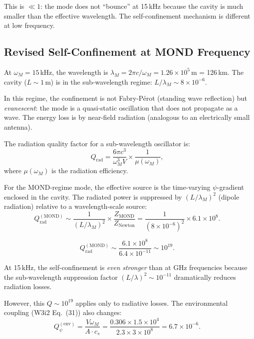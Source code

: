 \documentclass[11pt]{article}
\theoremstyle{definition}
\theoremstyle{remark}
\newcommand{\Qpsi}{Q_\psi}
\begin{document}
This is $\ll 1$: the mode does not ``bounce'' at 15\,kHz because
the cavity is much smaller than the effective wavelength. The
self-confinement mechanism is different at low frequency.

\subsection{Revised Self-Confinement at MOND Frequency}

At $\omega_M = 15$\,kHz, the wavelength is
$\lambda_M = 2\pi c / \omega_M = 1.26 \times 10^5$\,m = 126\,km.
The cavity ($L \sim 1$\,m) is in the sub-wavelength regime:
$L / \lambda_M \sim 8 \times 10^{-6}$.

In this regime, the confinement is not Fabry-P\'erot (standing wave
reflection) but \emph{evanescent}: the mode is a quasi-static
oscillation that does not propagate as a wave. The energy loss is
by near-field radiation (analogous to an electrically small antenna).

The radiation quality factor for a sub-wavelength oscillator is:
\begin{equation}
Q_{\mathrm{rad}} = \frac{6\pi c^3}{\omega_M^3 V}
\times \frac{1}{\mu(\omega_M)},
\end{equation}
where $\mu(\omega_M)$ is the radiation efficiency.

For the MOND-regime mode, the effective source is the time-varying
$\psi$-gradient enclosed in the cavity. The radiated power is
suppressed by $(L/\lambda_M)^2$ (dipole radiation) relative to a
wavelength-scale source:
\begin{equation}
Q_{\mathrm{rad}}^{(\mathrm{MOND})} \sim \frac{1}{(L/\lambda_M)^2}
\times \frac{Z_{\mathrm{MOND}}}{Z_{\mathrm{Newton}}}
= \frac{1}{(8 \times 10^{-6})^2} \times 6.1 \times 10^8.
\end{equation}

\begin{equation}
\boxed{Q_{\mathrm{rad}}^{(\mathrm{MOND})} \sim \frac{6.1 \times 10^8}
{6.4 \times 10^{-11}} \sim 10^{19}.}
\label{eq:Q-mond-15kHz}
\end{equation}

At 15\,kHz, the self-confinement is \emph{even stronger} than at
GHz frequencies because the sub-wavelength suppression factor
$(L/\lambda)^2 \sim 10^{-11}$ dramatically reduces radiation losses.

However, this $Q \sim 10^{19}$ applies only to radiative losses.
The environmental coupling (W3i2 Eq.~(31)) also changes:
\begin{equation}
\Qpsi^{(\mathrm{env})} = \frac{V \omega_M}{A \cdot c_s}
= \frac{0.306 \times 1.5 \times 10^4}{2.3 \times 3 \times 10^8}
= 6.7 \times 10^{-6}.
\end{equation}
\end{document}
